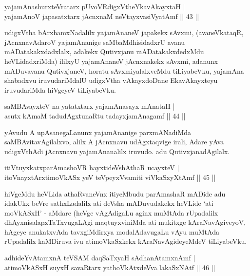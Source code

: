 \begin{shl}
yajamAnashurxteVratarx pUvoVRdigxVtheYkavAkayxtaH |\\
yajamAnoV japasatxtarx jAcnxnaM neVtayxvasiVyatAmf \hfill || 43 ||
\end{shl}

\begin{artha}
udigxVtha bArxhamxNadalilx yajamAnaneV japakekx sAvxmi, (avaneVkataqR, jAcnxnavAdaroV yajamAnanige saMbaMdhisidadxrU avanu mADatakakxdadxlalx, adakekx Qutivxjanu mADatakakxdedxMdu heVLidadxriMda) ililxyU yajamAnaneV jAcnxnakekx sAvxmi, adanunx mADuvavanu QutivxjaneV, horatu sAvxmiyalalxveMdu tiLiyabeVku, yajamAna shabadxvu iruvudariMdalU udigxVtha vAkayxdoDane EkavAkayxteyu iruvudariMda hiVgeyeV tiLiyabeVku.
\end{artha}

\begin{shl}
saMBAvayxteV na yatatxtarx yajamAnasayx mAnataH |\\
asutx kAmaM tadudAgxtunaRtu tadayxjamAnagamf \hfill || 44 ||
\end{shl}

\begin{artha}
yAvudu A upAsanegaLanunx yajamAnanige parxmANadiMda saMBAvitavAgilalxvo, alilx A jAcnxnavu udAgxtaqvige irali, Adare yAva udigxVthAdi jAcnxnavu yajamAnanalilx iruvudo. adu QutivxjanadAgilalx.
\end{artha}

\begin{shl}
itiVtuyxkatxparAmashoVR hayxtideVshAthaR ucayxteV |\\
itoV\s nayxtArxtimoVkASx yeV teV\s peyxVvamiti viVkaSxyXtAmf \hfill || 45 ||
\end{shl}

\begin{artha}
hiVgeMdu heVLida athaRvaneVnx itiyeMbudu parAmashaR mADide adu idakUkx beVre sathxLadalilx ati deVsha mADuvudakekx heVLide `ati moVkASxH' - aMdare (heVge vAgAdigaLu aginx muMtAda rUpadalilx dhAyxnisalapxTaTxvugaLAgi maqtuyxviniMda ati mukitxge kAraNavAgiveyoV, hAgeye anukatxvAda tavxgiMdirxya modalAdavugaLu vAyu muMtAda rUpadalilx kaMDiruva ivu atimoVkaSxkekx kAraNavAgideyeMdeV tiLiyabeVku.
\end{artha}


\begin{shl}
adhideYvAtamxnA teVSAM daqSaTxyaH sAdhanAtamxnAmf |\\
atimoVkASxH suyxH savaRtarx yathoVkAtxdeVva lakaSxNAtf \hfill || 46 ||
\end{shl}

